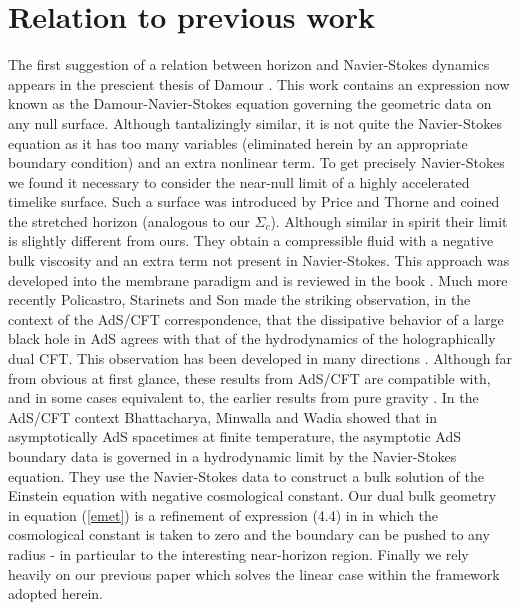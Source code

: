 \documentclass{article}
\def\sc{$\Sigma_c$}
\begin{document}
\section{Relation to previous work}

The first suggestion of a relation between horizon and Navier-Stokes dynamics
appears in the prescient thesis of Damour \cite{thesDamour}. This work contains an expression now known as the Damour-Navier-Stokes equation \cite{Gourgoulhon:2005ch} governing the geometric data on any null surface. Although tantalizingly similar, it is not quite the Navier-Stokes equation as it has too many variables (eliminated herein by an appropriate boundary condition) and an extra nonlinear term. To get precisely Navier-Stokes we found it necessary to consider the near-null limit of a highly accelerated timelike surface. Such a surface was introduced by Price and Thorne \cite{Price} and coined the stretched horizon (analogous to our \sc). Although similar in spirit their limit is slightly different from ours. They obtain a compressible fluid with a negative bulk viscosity and an extra term not present in Navier-Stokes.  This approach was developed into the membrane paradigm and is reviewed in the book \cite{Thorne:1986iy}.  Much more recently Policastro, Starinets and Son \cite{Policastro:2002se} made the striking observation, in the context of the AdS/CFT correspondence, that the dissipative behavior of a large black hole in AdS agrees with
that of the hydrodynamics of the holographically dual CFT.  This observation has been developed in many directions \cite{Policastro:2002tn,Kovtun:2003wp,Kovtun:2004de,Saremi:2007dn,Son:2007vk,Baier:2007ix,Brustein:2008cg,Rangamani:2008gi,
Mia:2009wj,Hartnoll:2009sz,McGreevy:2009xe,
Sachdev:2010ch,Hubeny:2010ry,Faulkner:2010jy}. Although far from obvious at first glance, these results from AdS/CFT are compatible with, and in some cases equivalent to,
the earlier results from pure gravity \cite{ Eling:2009pb,bkls,Starinets:2008fb,Iqbal:2008by,Kovtun:2003wp}. In the AdS/CFT context Bhattacharya, Minwalla and Wadia \cite{min,Eling:2009pb} showed that in asymptotically AdS spacetimes at finite temperature, the asymptotic AdS boundary data is governed in a hydrodynamic limit by the Navier-Stokes equation. They use the Navier-Stokes data to construct a bulk solution of the Einstein equation with negative cosmological constant.  Our dual bulk geometry in equation (\ref{emet}) is a refinement of expression (4.4) in \cite{min} in which the cosmological constant is taken to zero and the boundary can be pushed to any radius - in particular to the interesting near-horizon region. Finally we rely heavily on our previous paper \cite{bkls} which solves the linear case within the framework adopted herein.
\end{document}
